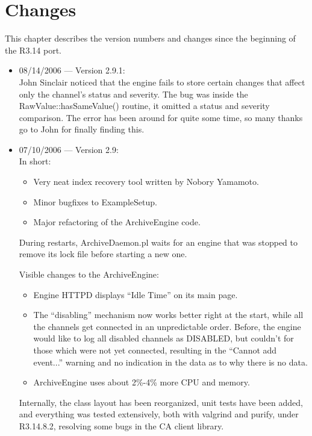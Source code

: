 \chapter{Changes}

This chapter describes the version numbers and changes since
the beginning of the R3.14 port.

\begin{itemize}

\item 08/14/2006 --- Version 2.9.1:\\
John Sinclair noticed that the engine fails to store certain
changes that affect only the channel's status and severity.
The bug was inside the RawValue::hasSameValue() routine, it
omitted a status and severity comparison. The error has been
around for quite some time, so many thanks go to John for
finally finding this.

\item 07/10/2006 --- Version 2.9:\\
In short:
\begin{itemize}
\item Very neat index recovery tool written by Nobory Yamamoto.
\item Minor bugfixes to ExampleSetup.
\item Major refactoring of the ArchiveEngine code.
\end{itemize}

During restarts, ArchiveDaemon.pl waits for an engine that was stopped
to remove its lock file before starting a new one.

Visible changes to the ArchiveEngine:
\begin{itemize}
\item Engine HTTPD displays ``Idle Time'' on its main page.
\item The ``disabling'' mechanism now works better right at the start,
      while all the channels get connected in an unpredictable order.
      Before, the engine would like to log all disabled channels as DISABLED,
      but couldn't for those which were not yet connected,
      resulting in the ``Cannot add event...'' warning and no indication
      in the data as to why there is no data.
\item ArchiveEngine uses about 2\%-4\% more CPU and memory.
\end{itemize}

Internally, the class layout has been reorganized,
unit tests have been added, and everything was tested
extensively, both with valgrind and purify,
under R3.14.8.2, resolving some bugs in the CA client library.


\end{itemize}
